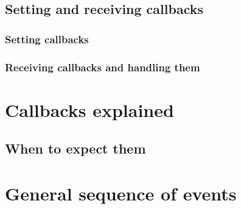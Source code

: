 \subsection*{Setting and receiving callbacks}

\subsubsection*{Setting callbacks}

\subsubsection*{Receiving callbacks and handling them}

\section*{Callbacks explained}

\subsection*{When to expect them}

\section*{General sequence of events}